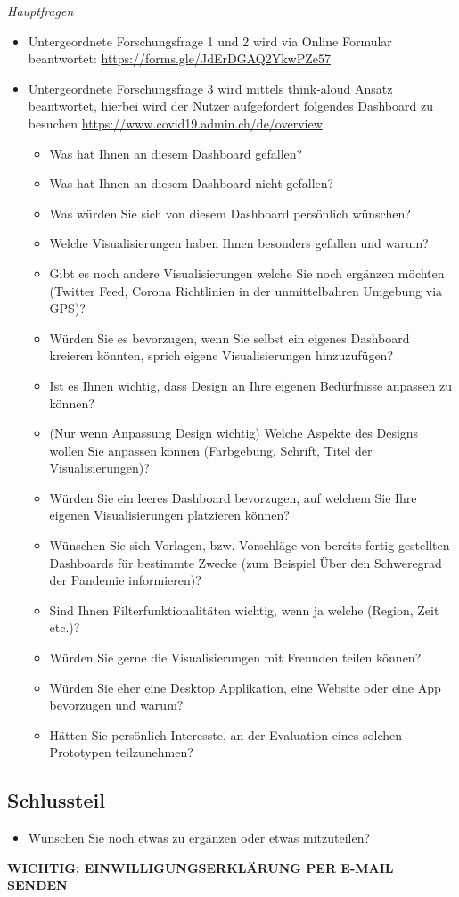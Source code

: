 \textit{Hauptfragen}
\begin{itemize}
    \item Untergeordnete Forschungsfrage 1 und 2 wird via Online Formular beantwortet: \url{https://forms.gle/JdErDGAQ2YkwPZe57}
    \item Untergeordnete Forschungsfrage 3 wird mittels think-aloud Ansatz beantwortet, hierbei wird der Nutzer aufgefordert folgendes Dashboard zu besuchen \url{https://www.covid19.admin.ch/de/overview}
    \begin{itemize}
        \item Was hat Ihnen an diesem Dashboard gefallen?
        \item Was hat Ihnen an diesem Dashboard nicht gefallen?
        \item Was würden Sie sich von diesem Dashboard persönlich wünschen?
        \item Welche Visualisierungen haben Ihnen besonders gefallen und warum?
        \item Gibt es noch andere Visualisierungen welche Sie noch ergänzen möchten (Twitter Feed, Corona Richtlinien in der unmittelbahren Umgebung via GPS)?
        \item Würden Sie es bevorzugen, wenn Sie selbst ein eigenes Dashboard kreieren könnten, sprich eigene Visualisierungen hinzuzufügen?
        \item Ist es Ihnen wichtig, dass Design an Ihre eigenen Bedürfnisse anpassen zu können?
        \item (Nur wenn Anpassung Design wichtig) Welche Aspekte des Designs wollen Sie anpassen können (Farbgebung, Schrift, Titel der Visualisierungen)?
        \item Würden Sie ein leeres Dashboard bevorzugen, auf welchem Sie Ihre eigenen Visualisierungen platzieren können?
        \item Wünschen Sie sich Vorlagen, bzw. Vorschläge von bereits fertig gestellten Dashboards für bestimmte Zwecke (zum Beispiel Über den Schweregrad der Pandemie informieren)?
        \item Sind Ihnen Filterfunktionalitäten wichtig, wenn ja welche (Region, Zeit etc.)?
        \item Würden Sie gerne die Visualisierungen mit Freunden teilen können?
        \item Würden Sie eher eine Desktop Applikation, eine Website oder eine App bevorzugen und warum?
        \item Hätten Sie persönlich Interesste, an der Evaluation eines solchen Prototypen teilzunehmen?
    \end{itemize}
\end{itemize}


\subsection{Schlussteil}
\begin{itemize}
    \item Wünschen Sie noch etwas zu ergänzen oder etwas mitzuteilen?
\end{itemize}

\textbf{WICHTIG: EINWILLIGUNGSERKLÄRUNG PER E-MAIL SENDEN}